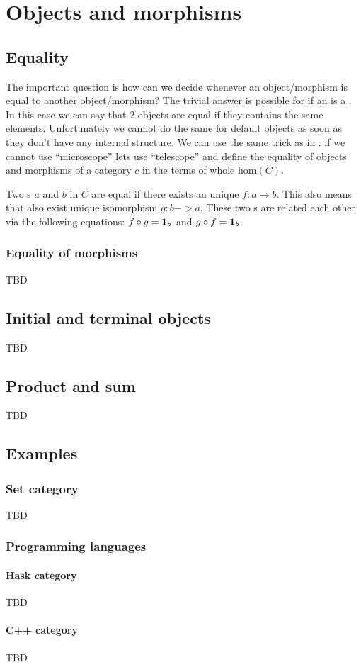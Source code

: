 \chapter{Objects and morphisms}

\section{Equality}

The important question is how can we decide whenever an
object/morphism is equal to another object/morphism? The trivial
answer is possible for if an  is a
. In this case we can say that 2 objects are equal
if they contains the same elements. Unfortunately we cannot do the
same for default objects as soon as they don't have any internal
structure. We can use the same trick as in
: if we cannot use ``microscope'' lets
use ``telescope'' and define the equality of objects and morphisms of
a category $c$ in the terms of whole $\mathrm{hom}(C)$.

\begin{definition}
\label{def:object_equality}
Two s $a$ and $b$ in 
$C$ are equal if there exists an unique 
$f: a \to b$. This also means that also exist unique isomorphism $g: b
-> a$. These two s are related each other via
the following equations: $f \circ g = \idarrow[a]$ and $g \circ f
= \idarrow[b]$. 
\end{definition}

\subsection{Equality of morphisms}
TBD

\section{Initial and terminal objects}
TBD

\section{Product and sum}
TBD

\section{Examples}

\subsection{\textbf{Set} category}
TBD

\subsection{Programming languages}
\subsubsection{\textbf{Hask} category}
TBD
\subsubsection{\textbf{C++} category}
TBD


